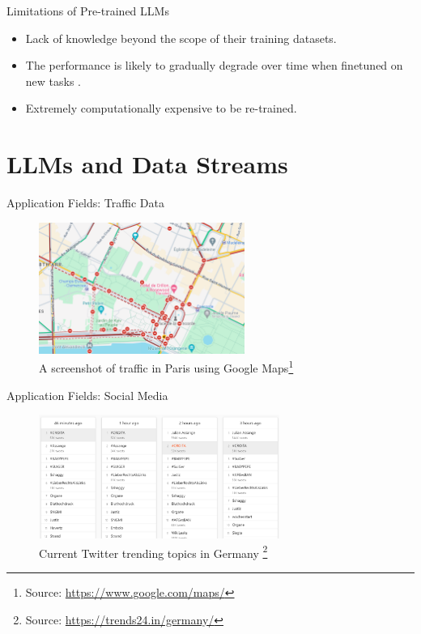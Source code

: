 \documentclass[t]{beamer}
\begin{document}
\begin{frame}{Limitations of Pre-trained LLMs}
  \vspace{1cm}
  \begin{itemize}
    \item Lack of knowledge beyond the scope of their training datasets.
    \newline
    \item The performance is likely to gradually degrade over time when finetuned on new tasks \cite{Shi24}.
    \newline
    \item Extremely computationally expensive to be re-trained.
  \end{itemize}
\end{frame}

\section{LLMs and Data Streams}
\begin{frame}{Application Fields: Traffic Data}
  \begin{figure}
    \centering
    \includegraphics[width=0.6\textwidth]{paris_traffic.png}
    \caption{A screenshot of traffic in Paris using Google Maps\footnote{Source: \url{https://www.google.com/maps/}}}
    \label{fig:paris}
\end{figure}
\end{frame}

\begin{frame}{Application Fields: Social Media}
  \begin{figure}
    \centering
    \includegraphics[width=0.7\textwidth]{trends.png}
    \caption{Current Twitter trending topics in Germany \footnote{Source: \url{https://trends24.in/germany/}}}
    \label{fig:trend}
\end{figure}
\end{frame}
\end{document}

